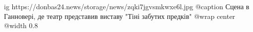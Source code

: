  
 
 
 
 

\ifcmt
  ig https://donbas24.news/storage/news/zqki7jgvsmkwxe6l.jpg
	@caption Сцена в Ганновері, де театр представив виставу "Тіні забутих предків"
  @wrap center
  @width 0.8
\fi
